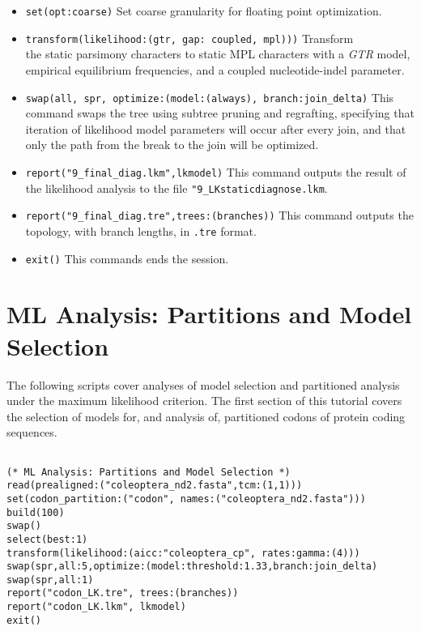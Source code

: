 \begin{itemize}
\item \texttt{set(opt:coarse)} Set coarse granularity for floating point optimization.
\item \texttt{transform(likelihood:(gtr, gap: coupled, mpl)))} Transform \\ the static parsimony characters to static 
MPL characters with a \emph{GTR} model, empirical equilibrium frequencies, and a coupled nucleotide-indel 
parameter.
\item \texttt{swap(all, spr, optimize:(model:(always), branch:join\_delta)} This command swaps the tree using 
subtree pruning and regrafting, specifying that iteration of likelihood model parameters will occur after every 
join, and that only the path from the break to the join will be optimized. 
\item \texttt{report("9\_final\_diag.lkm",lkmodel)} This command outputs the result of 
the likelihood analysis to the file \texttt{"9\_LKstaticdiagnose.lkm}.
\item \texttt{report("9\_final\_diag.tre",trees:(branches))} This command outputs the topology, 
with branch lengths, in \texttt{.tre} format.
\item \texttt{exit()} This commands ends the \poy session.
\end{itemize}


\section{ML Analysis: Partitions and Model Selection}{\label{tutorial14}}

The following scripts cover analyses of model selection and partitioned analysis under the maximum likelihood criterion. The 
first section of this tutorial covers the selection of models for, and analysis of, partitioned codons of protein coding sequences. 

\begin{verbatim}

(* ML Analysis: Partitions and Model Selection *) 
read(prealigned:("coleoptera_nd2.fasta",tcm:(1,1)))
set(codon_partition:("codon", names:("coleoptera_nd2.fasta")))
build(100)
swap()
select(best:1)
transform(likelihood:(aicc:"coleoptera_cp", rates:gamma:(4)))
swap(spr,all:5,optimize:(model:threshold:1.33,branch:join_delta)
swap(spr,all:1)
report("codon_LK.tre", trees:(branches))
report("codon_LK.lkm", lkmodel)
exit()
\end{verbatim}

